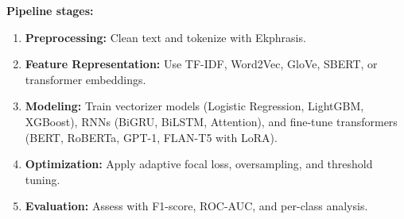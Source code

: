

{
    \textbf{Pipeline stages:}
    \begin{enumerate}
        \item \textbf{Preprocessing:} Clean text and tokenize with Ekphrasis.
        \item \textbf{Feature Representation:} Use TF-IDF, Word2Vec, GloVe, SBERT, or transformer embeddings.
        \item \textbf{Modeling:} Train vectorizer models (Logistic Regression, LightGBM, XGBoost), RNNs (BiGRU, BiLSTM, Attention), and fine-tune transformers (BERT, RoBERTa, GPT-1, FLAN-T5 with LoRA).
        \item \textbf{Optimization:} Apply adaptive focal loss, oversampling, and threshold tuning.
        \item \textbf{Evaluation:} Assess with F1-score, ROC-AUC, and per-class analysis.
    \end{enumerate}


}

